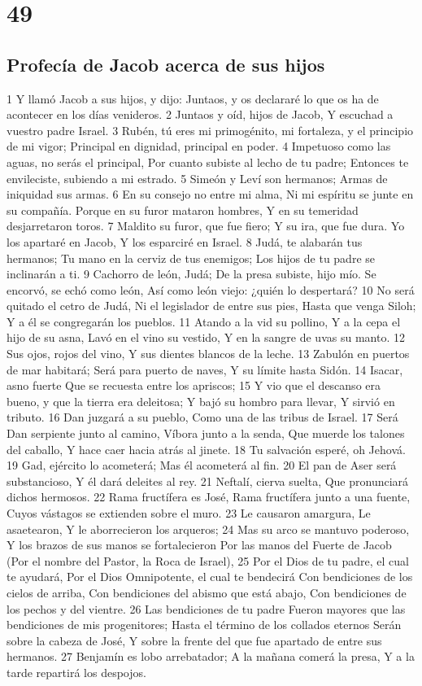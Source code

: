 \chapter{49}

\section{Profecía de Jacob acerca de sus hijos}

1 Y llamó Jacob a sus hijos, y dijo: Juntaos, y os declararé lo que os ha de acontecer en los días venideros.
2 Juntaos y oíd, hijos de Jacob,
Y escuchad a vuestro padre Israel.
3 Rubén, tú eres mi primogénito, mi fortaleza, y el principio de mi vigor;
Principal en dignidad, principal en poder.
4 Impetuoso como las aguas, no serás el principal,
Por cuanto subiste al lecho de tu padre;
Entonces te envileciste, subiendo a mi estrado.
5 Simeón y Leví son hermanos;
Armas de iniquidad sus armas.
6 En su consejo no entre mi alma,
Ni mi espíritu se junte en su compañía.
Porque en su furor mataron hombres,
Y en su temeridad desjarretaron toros.
7 Maldito su furor, que fue fiero;
Y su ira, que fue dura.
Yo los apartaré en Jacob,
Y los esparciré en Israel.
8 Judá, te alabarán tus hermanos;
Tu mano en la cerviz de tus enemigos;
Los hijos de tu padre se inclinarán a ti.
9 Cachorro de león, Judá;
De la presa subiste, hijo mío.
Se encorvó, se echó como león,
Así como león viejo: ¿quién lo despertará?
10 No será quitado el cetro de Judá,
Ni el legislador de entre sus pies,
Hasta que venga Siloh;
Y a él se congregarán los pueblos.
11 Atando a la vid su pollino,
Y a la cepa el hijo de su asna,
Lavó en el vino su vestido,
Y en la sangre de uvas su manto.
12 Sus ojos, rojos del vino,
Y sus dientes blancos de la leche.
13 Zabulón en puertos de mar habitará;
Será para puerto de naves,
Y su límite hasta Sidón.
14 Isacar, asno fuerte
Que se recuesta entre los apriscos;
15 Y vio que el descanso era bueno, y que la tierra era deleitosa;
Y bajó su hombro para llevar,
Y sirvió en tributo.
16 Dan juzgará a su pueblo,
Como una de las tribus de Israel.
17 Será Dan serpiente junto al camino,
Víbora junto a la senda,
Que muerde los talones del caballo,
Y hace caer hacia atrás al jinete.
18 Tu salvación esperé, oh Jehová.
19 Gad, ejército lo acometerá;
Mas él acometerá al fin.
20 El pan de Aser será substancioso,
Y él dará deleites al rey.
21 Neftalí, cierva suelta,
Que pronunciará dichos hermosos.
22 Rama fructífera es José,
Rama fructífera junto a una fuente,
Cuyos vástagos se extienden sobre el muro.
23 Le causaron amargura,
Le asaetearon,
Y le aborrecieron los arqueros;
24 Mas su arco se mantuvo poderoso,
Y los brazos de sus manos se fortalecieron
Por las manos del Fuerte de Jacob
(Por el nombre del Pastor, la Roca de Israel),
25 Por el Dios de tu padre, el cual te ayudará,
Por el Dios Omnipotente, el cual te bendecirá
Con bendiciones de los cielos de arriba,
Con bendiciones del abismo que está abajo,
Con bendiciones de los pechos y del vientre.
26 Las bendiciones de tu padre
Fueron mayores que las bendiciones de mis progenitores;
Hasta el término de los collados eternos
Serán sobre la cabeza de José,
Y sobre la frente del que fue apartado de entre sus hermanos.
27 Benjamín es lobo arrebatador;
A la mañana comerá la presa,
Y a la tarde repartirá los despojos.

